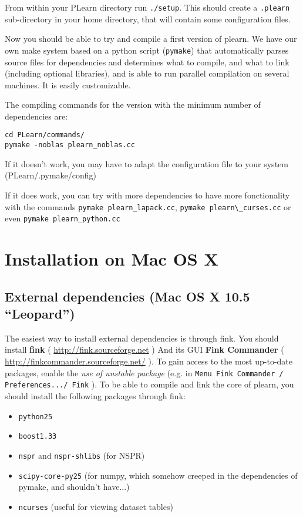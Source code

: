 \documentclass[11pt]{book}
\begin{document}
From within your PLearn directory run {\tt ./setup}. This should create a
{\tt .plearn} sub-directory in your home directory, that will contain some
configuration files.

Now you should be able to try and compile a first version of plearn.
We have our own make system based on a python script ({\tt pymake}) that
automatically parses source files for dependencies and determines what to
compile, and what to link (including optional libraries), and is able to
run parallel compilation on several machines.  It is easily
customizable.

The compiling commands for the version with the minimum number of dependencies are:
\begin{verbatim}
cd PLearn/commands/
pymake -noblas plearn_noblas.cc
\end{verbatim}

If it doesn't work, you may have to adapt the configuration file to your system
(PLearn/.pymake/config)

If it does work, you can try with more dependencies to have more fonctionality with the commands \verb!pymake plearn_lapack.cc!, \verb!pymake plearn\_curses.cc! or even \verb!pymake plearn_python.cc!

\section{Installation on Mac OS X}

\subsection{External dependencies (Mac OS X 10.5 ``Leopard'')}

The easiest way to install external dependencies is through fink.
You should install {\bf fink} ( \url{http://fink.sourceforge.net} )
And its GUI {\bf Fink Commander} ( \url{http://finkcommander.sourceforge.net/} ).
To gain access to the most up-to-date packages, enable the {\em use of unstable package} (e.g. in {\tt Menu Fink
Commander / Preferences.../ Fink} ).
To be able to compile and link the core of plearn, you should install the
following packages through fink:
\begin{itemize}
\item {\tt python25}
\item {\tt boost1.33}
\item {\tt nspr} and {\tt nspr-shlibs} (for NSPR)
\item {\tt scipy-core-py25} (for numpy, which somehow creeped in the dependencies of pymake, and shouldn't have...)
\item {\tt ncurses}  (useful for viewing dataset tables)
\end{itemize}
\end{document}
